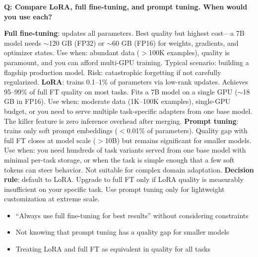 \begin{interviewq}
\end{interviewq}

\begin{interviewq}
\textbf{Q: Compare LoRA, full fine-tuning, and prompt tuning. When would you use each?}

 \quad {} \quad \badgefreq{\freqhigh}

\stronganswer \textbf{Full fine-tuning}: updates all parameters. Best quality but highest cost---a 7B model needs $\sim$120 GB (FP32) or $\sim$60 GB (FP16) for weights, gradients, and optimizer states. Use when: abundant data ($>$100K examples), quality is paramount, and you can afford multi-GPU training. Typical scenario: building a flagship production model. Risk: catastrophic forgetting if not carefully regularized. \textbf{LoRA}: trains 0.1--1\% of parameters via low-rank updates. Achieves 95--99\% of full FT quality on most tasks. Fits a 7B model on a single GPU ($\sim$18 GB in FP16). Use when: moderate data (1K--100K examples), single-GPU budget, or you need to serve multiple task-specific adapters from one base model. The killer feature is zero inference overhead after merging. \textbf{Prompt tuning}: trains only soft prompt embeddings ($<$0.01\% of parameters). Quality gap with full FT closes at model scale ($>$10B) but remains significant for smaller models. Use when: you need hundreds of task variants served from one base model with minimal per-task storage, or when the task is simple enough that a few soft tokens can steer behavior. Not suitable for complex domain adaptation. \textbf{Decision rule}: default to LoRA. Upgrade to full FT only if LoRA quality is measurably insufficient on your specific task. Use prompt tuning only for lightweight customization at extreme scale.

\redflags
\begin{itemize}
    \item ``Always use full fine-tuning for best results'' without considering constraints
    \item Not knowing that prompt tuning has a quality gap for smaller models
    \item Treating LoRA and full FT as equivalent in quality for all tasks
\end{itemize}



\end{interviewq}
